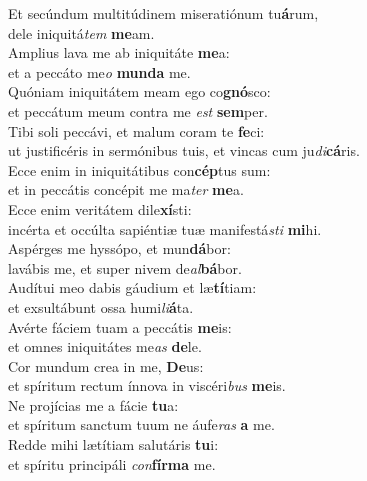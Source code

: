 \evenverse Et secúndum multitúdinem miseratiónum tu\textbf{á}rum,~\*\\
\evenverse dele iniquitá\textit{tem} \textbf{me}am.\\
\oddverse Amplius lava me ab iniquitáte \textbf{me}a:~\*\\
\oddverse et a peccáto me\textit{o} \textbf{mun}\textbf{da} me.\\
\evenverse Quóniam iniquitátem meam ego co\textbf{gnó}sco:~\*\\
\evenverse et peccátum meum contra me \textit{est} \textbf{sem}per.\\
\oddverse Tibi soli peccávi, et malum coram te \textbf{fe}ci:~\*\\
\oddverse ut justificéris in sermónibus tuis, et vincas cum ju\textit{di}\textbf{cá}ris.\\
\evenverse Ecce enim in iniquitátibus con\textbf{cép}tus sum:~\*\\
\evenverse et in peccátis concépit me ma\textit{ter} \textbf{me}a.\\
\oddverse Ecce enim veritátem dile\textbf{xí}sti:~\*\\
\oddverse incérta et occúlta sapiéntiæ tuæ manifestá\textit{sti} \textbf{mi}hi.\\
\evenverse Aspérges me hyssópo, et mun\textbf{dá}bor:~\*\\
\evenverse lavábis me, et super nivem de\textit{al}\textbf{bá}bor.\\
\oddverse Audítui meo dabis gáudium et læ\textbf{tí}tiam:~\*\\
\oddverse et exsultábunt ossa humi\textit{li}\textbf{á}ta.\\
\evenverse Avérte fáciem tuam a peccátis \textbf{me}is:~\*\\
\evenverse et omnes iniquitátes me\textit{as} \textbf{de}le.\\
\oddverse Cor mundum crea in me, \textbf{De}us:~\*\\
\oddverse et spíritum rectum ínnova in viscéri\textit{bus} \textbf{me}is.\\
\evenverse Ne projícias me a fácie \textbf{tu}a:~\*\\
\evenverse et spíritum sanctum tuum ne áufe\textit{ras} \textbf{a} me.\\
\oddverse Redde mihi lætítiam salutáris \textbf{tu}i:~\*\\
\oddverse et spíritu principáli \textit{con}\textbf{fír}\textbf{ma} me.\\
